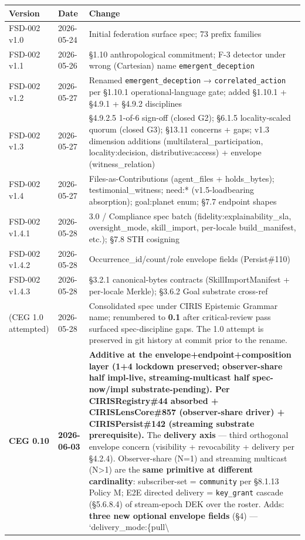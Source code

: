 \documentclass[10pt]{article}
\begin{document}
{\footnotesize
\begin{longtable}{|p{5.33cm}|p{5.33cm}|p{5.33cm}|}\hline
\textbf{Version} & \textbf{Date} & \textbf{Change} \\ \hline\endhead
FSD-002 v1.0 & 2026-05-24 & Initial federation surface spec; 73 prefix families \\ \hline
FSD-002 v1.1 & 2026-05-26 & §1.10 anthropological commitment; F-3 detector under wrong (Cartesian) name \texttt{emergent\_deception} \\ \hline
FSD-002 v1.2 & 2026-05-27 & Renamed \texttt{emergent\_deception} → \texttt{correlated\_action} per §1.10.1 operational-language gate; added §1.10.1 + §4.9.1 + §4.9.2 disciplines \\ \hline
FSD-002 v1.3 & 2026-05-27 & §4.9.2.5 1-of-6 sign-off (closed G2); §6.1.5 locality-scaled quorum (closed G3); §13.11 concerns + gaps; v1.3 dimension additions (multilateral\_participation, locality:decision, distributive:access) + envelope (witness\_relation) \\ \hline
FSD-002 v1.4 & 2026-05-27 & Files-as-Contributions (agent\_files + holds\_bytes); testimonial\_witness; need:* (v1.5-loadbearing absorption); goal:planet enum; §7.7 endpoint shapes \\ \hline
FSD-002 v1.4.1 & 2026-05-28 & 3.0 / Compliance spec batch (fidelity:explainability\_sla, oversight\_mode, skill\_import, per-locale build\_manifest, etc.); §7.8 STH cosigning \\ \hline
FSD-002 v1.4.2 & 2026-05-28 & Occurrence\_id/count/role envelope fields (Persist\#110) \\ \hline
FSD-002 v1.4.3 & 2026-05-28 & §3.2.1 canonical-bytes contracts (SkillImportManifest + per-locale Merkle); §3.6.2 Goal substrate cross-ref \\ \hline
(CEG 1.0 attempted) & 2026-05-28 & Consolidated spec under CIRIS Epistemic Grammar name; renumbered to \textbf{0.1} after critical-review pass surfaced spec-discipline gaps. The 1.0 attempt is preserved in git history at commit prior to the rename. \\ \hline
\textbf{CEG 0.10} & \textbf{2026-06-03} & \textbf{Additive at the envelope+endpoint+composition layer (1+4 lockdown preserved; observer-share half impl-live, streaming-multicast half spec-now/impl substrate-pending). Per CIRISRegistry\#44 absorbed + CIRISLensCore\#857 (observer-share driver) + CIRISPersist\#142 (streaming substrate prerequisite).} The \textbf{delivery axis} — third orthogonal envelope concern (visibility + revocability + delivery per §4.2.4). Observer-share (N=1) and streaming multicast (N>1) are the \textbf{same primitive at different cardinality}: subscriber-set = \texttt{community} per §8.1.13 Policy M; E2E directed delivery = \texttt{key\_grant} cascade (§5.6.8.4) of stream-epoch DEK over the roster. Adds: \textbf{three new optional envelope fields} (§4) — `delivery\_mode:\{pull\textbackslash{} \\ \hline

\end{longtable}}
\end{document}
